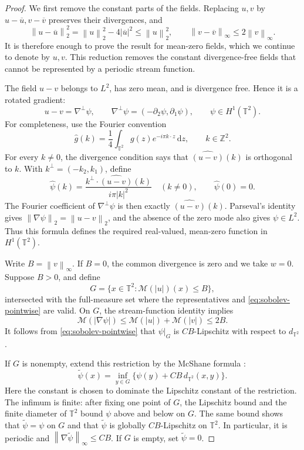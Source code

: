 \documentclass[11pt]{article}
\newcommand{\Z}{\mathbb Z}
\newcommand{\T}{\mathbb T^2}
\newcommand{\cM}{\mathcal M}
\newcommand{\norm}[1]{\left\lVert #1\right\rVert}
\theoremstyle{remark}
\numberwithin{equation}{section}
\begin{document}
\begin{proof}
We first remove the constant parts of the fields. Replacing \(u,v\)
by \(u-\overline u,v-\overline v\) preserves their divergences, and
\[
 \norm{u-\overline u}_2^2=\norm u_2^2-4|\overline u|^2
 \le\norm u_2^2,\qquad
 \norm{v-\overline v}_\infty\le2\norm v_\infty.
\]
It is therefore enough to prove the result for mean-zero fields, which
we continue to denote by \(u,v\). This reduction removes the constant
divergence-free fields that cannot be represented by a periodic stream
function.

The field \(u-v\) belongs to \(L^2\), has zero mean, and is
divergence free. Hence it is a rotated gradient:
\[
 u-v=\nabla^\perp\psi,
 \qquad \nabla^\perp\psi=(-\partial_2\psi,\partial_1\psi),
 \qquad \psi\in H^1(\T).
\]
For completeness, use the Fourier convention
\[
 \widehat g(k)=\frac14\int_{\T}g(z)e^{-i\pi k\cdot z}\,\mathrm dz,
 \qquad k\in\Z^2.
\]
For every \(k\ne0\), the divergence condition says that
\(\widehat{(u-v)}(k)\) is orthogonal to \(k\). With
\(k^\perp=(-k_2,k_1)\), define
\[
 \widehat\psi(k)=
 \frac{k^\perp\cdot\widehat{(u-v)}(k)}{i\pi|k|^2}
 \quad(k\ne0),\qquad \widehat\psi(0)=0.
\]
The Fourier coefficient of \(\nabla^\perp\psi\) is then exactly
\(\widehat{(u-v)}(k)\). Parseval's identity gives
\(\norm{\nabla\psi}_2=\norm{u-v}_2\), and the absence of the zero
mode also gives \(\psi\in L^2\). Thus this formula defines the
required real-valued, mean-zero function in \(H^1(\T)\).

Write \(B=\norm v_\infty\). If \(B=0\), the common divergence is
zero and we take \(w=0\). Suppose \(B>0\), and define
\[
 G=\{x\in\T:\cM(|u|)(x)\le B\},
\]
intersected with the full-measure set where the representatives and
\eqref{eq:sobolev-pointwise} are valid. On \(G\), the stream-function
identity implies
\[
 \cM(|\nabla\psi|)
 \le\cM(|u|)+\cM(|v|)\le2B.
\]
It follows from \eqref{eq:sobolev-pointwise} that \(\psi|_G\) is
\(CB\)-Lipschitz with respect to \(d_{\T}\).

If \(G\) is nonempty, extend this restriction by the McShane formula
\cite[Lemma~5]{Haj00}:
\[
 \widetilde\psi(x)
 =\inf_{y\in G}\{\psi(y)+CB\,d_{\T}(x,y)\}.
\]
Here the constant is chosen to dominate the Lipschitz constant of the
restriction. The infimum is finite: after fixing one point of \(G\),
the Lipschitz bound and the finite diameter of \(\T\) bound \(\psi\)
above and below on \(G\). The same bound shows that
\(\widetilde\psi=\psi\) on \(G\) and that
\(\widetilde\psi\) is globally \(CB\)-Lipschitz on \(\T\).
In particular, it is periodic and
\(\norm{\nabla\widetilde\psi}_\infty\le CB\). If \(G\) is empty,
set \(\widetilde\psi=0\).


\end{proof}
\end{document}
